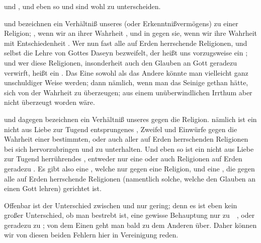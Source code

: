  und , und eben so  und  sind wohl zu unterscheiden.
\begin{aufza}
\item {} und  bezeichnen ein Verhältniß unseres  (oder Erkenntnißvermögens) zu einer Religion; , wenn wir an ihrer Wahrheit , und in  gegen sie, wenn wir ihre Wahrheit mit Entschiedenheit . Wer nun fast alle auf Erden herrschende Religionen, und selbst die Lehre von Gottes Daseyn bezweifelt, der heißt uns vorzugsweise ein ; und wer diese Religionen, insonderheit auch den Glauben an Gott geradezu verwirft, heißt ein . Das Eine sowohl als das Andere könnte man vielleicht ganz unschuldiger Weise werden; dann nämlich, wenn man das Seinige gethan hätte, sich von der Wahrheit zu überzeugen; aus einem unüberwindlichen Irrthum aber nicht überzeugt worden wäre.
\item {} und  dagegen bezeichnen ein Verhältniß unseres  gegen die Religion.  nämlich ist ein nicht aus Liebe zur Tugend entsprungenes , Zweifel und Einwürfe gegen die Wahrheit einer bestimmten, oder auch aller auf Erden herrschenden Religionen bei sich hervorzubringen und zu unterhalten. Und eben so ist  ein nicht aus Liebe zur Tugend herrührendes , entweder nur eine  oder auch  Religionen auf Erden geradezu . Es gibt also eine , welche nur gegen eine  Religion, und eine , die gegen alle auf Erden herrschende Religionen (namentlich solche, welche den Glauben an einen Gott lehren) gerichtet ist.
\end{aufza}
\begin{RWanm}
Offenbar ist der Unterschied zwischen  und  nur gering; denn es ist eben kein großer Unterschied, ob man bestrebt ist, eine gewisse Behauptung nur zu~\ , oder geradezu zu ; von dem Einen geht man bald zu dem Anderen über. Daher können wir von diesen beiden Fehlern hier in Vereinigung reden.
\end{RWanm}

